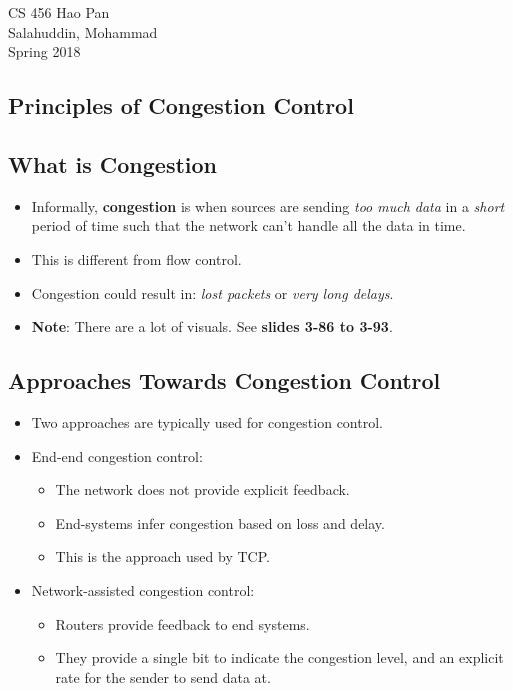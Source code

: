\documentclass{article}
\begin{document}
\noindent
{CS 456 \hfill Hao Pan}\\
{Salahuddin, Mohammad}\\
{Spring 2018}


\begin{center}
\section{Principles of Congestion Control}
\noindent
\end{center}

\subsection{What is Congestion}

\begin{itemize}
\item Informally, {\bf congestion} is when sources are sending \emph{too much data} in a \emph{short} period of time such that the network can't handle all the data in time.
\item This is different from flow control.
\item Congestion could result in: \emph{lost packets} or \emph{very long delays}.
\item {\bf Note}: There are a lot of visuals. See {\bf slides 3-86 to 3-93}.
\end{itemize}

\subsection{Approaches Towards Congestion Control}

\begin{itemize}
\item Two approaches are typically used for congestion control.
\item End-end congestion control:
\begin{itemize}
\item The network does not provide explicit feedback.
\item End-systems infer congestion based on loss and delay.
\item This is the approach used by TCP.
\end{itemize}
\item Network-assisted congestion control:
\begin{itemize}
\item Routers provide feedback to end systems.
\item They provide a single bit to indicate the congestion level, and an explicit rate for the sender to send data at.
\end{itemize}
\end{itemize}
\end{document}
